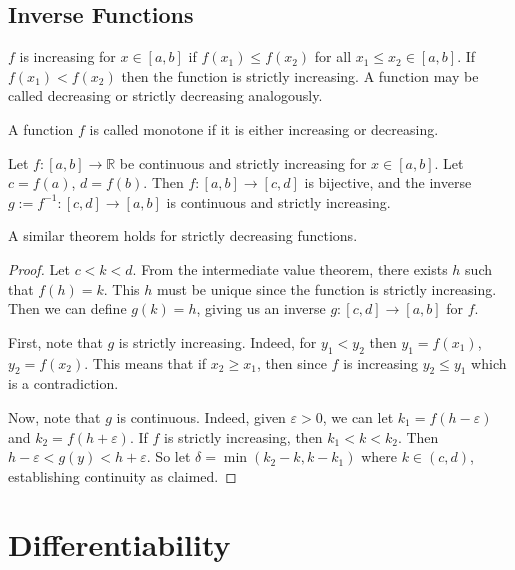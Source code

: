 \documentclass{article}
\begin{document}
\subsection{Inverse Functions}
\begin{definition}
    $f$ is increasing for $x \in [a, b]$ if $f(x_1) \leq f(x_2)$ for all $x_1 \leq x_2 \in [a, b]$. If $f(x_1) < f(x_2)$ then the function is strictly increasing. A function may be called decreasing or strictly decreasing analogously.
\end{definition}
\begin{definition}
    A function $f$ is called monotone if it is either increasing or decreasing.
\end{definition}
\begin{theorem}
    Let $f \colon [a, b] \to \mathbb R$ be continuous and strictly increasing for $x \in [a, b]$. Let $c = f(a)$, $d = f(b)$. Then $f \colon [a, b] \to [c, d]$ is bijective, and the inverse $g := f^{-1} \colon [c, d] \to [a, b]$ is continuous and strictly increasing.
\end{theorem}
\noindent A similar theorem holds for strictly decreasing functions.
\begin{proof}
    Let $c < k < d$. From the intermediate value theorem, there exists $h$ such that $f(h) = k$. This $h$ must be unique since the function is strictly increasing. Then we can define $g(k) = h$, giving us an inverse $g \colon [c, d] \to [a, b]$ for $f$.

    First, note that $g$ is strictly increasing. Indeed, for $y_1 < y_2$ then $y_1 = f(x_1)$, $y_2 = f(x_2)$. This means that if $x_2 \geq x_1$, then since $f$ is increasing $y_2 \leq y_1$ which is a contradiction.

    Now, note that $g$ is continuous. Indeed, given $\varepsilon > 0$, we can let $k_1 = f(h - \varepsilon)$ and $k_2 = f(h + \varepsilon)$. If $f$ is strictly increasing, then $k_1 < k < k_2$. Then $h - \varepsilon < g(y) < h + \varepsilon$. So let $\delta = \min(k_2 - k, k - k_1)$ where $k \in (c, d)$, establishing continuity as claimed.
\end{proof}

\section{Differentiability}
\end{document}
